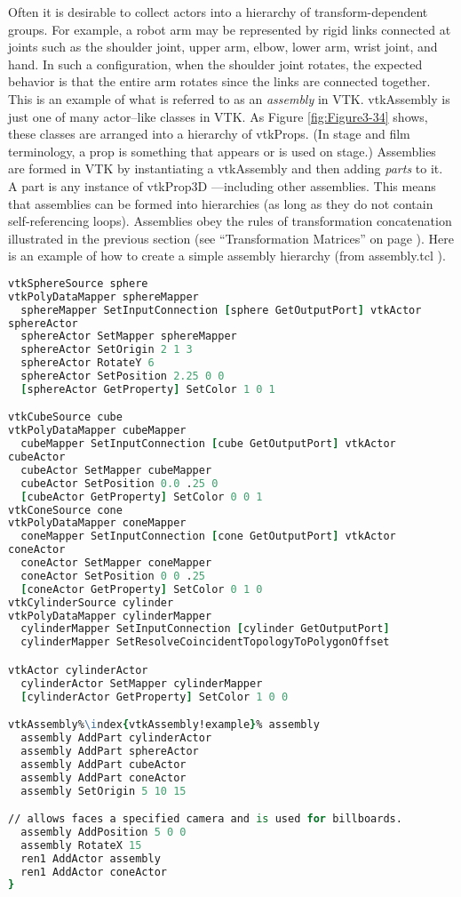 Often it is desirable to collect actors into a hierarchy of transform-dependent groups. For example, a robot arm may be represented by rigid links connected at joints such as the shoulder joint, upper arm, elbow, lower arm, wrist joint, and hand. In such a configuration, when the shoulder joint rotates, the expected behavior is that the entire arm rotates since the links are connected together. This is an example of what is referred to as an \emph{assembly} in VTK. vtkAssembly is just one of many actor--like classes in VTK. As Figure \ref{fig:Figure3-34} shows, these classes are arranged into a hierarchy of vtkProps. (In stage and film terminology, a prop is something that appears or is used on stage.) Assemblies are formed in VTK by instantiating a vtkAssembly and then adding \emph{parts} to it. A part is any instance of vtkProp3D ---including other assemblies. This means that assemblies can be formed into hierarchies (as long as they do not contain self-referencing loops). Assemblies obey the rules of transformation concatenation illustrated in the previous section (see ``Transformation Matrices'' on page \pageref{subsubsec:transform_matrices} ). Here is an example of how to create a simple assembly hierarchy (from assembly.tcl ).

\begin{lstlisting}[language=TCL, caption={Part of assembly.tcl}, escapechar=\%]
vtkSphereSource sphere
vtkPolyDataMapper sphereMapper
  sphereMapper SetInputConnection [sphere GetOutputPort] vtkActor
sphereActor
  sphereActor SetMapper sphereMapper
  sphereActor SetOrigin 2 1 3
  sphereActor RotateY 6
  sphereActor SetPosition 2.25 0 0
  [sphereActor GetProperty] SetColor 1 0 1

vtkCubeSource cube
vtkPolyDataMapper cubeMapper
  cubeMapper SetInputConnection [cube GetOutputPort] vtkActor
cubeActor
  cubeActor SetMapper cubeMapper
  cubeActor SetPosition 0.0 .25 0
  [cubeActor GetProperty] SetColor 0 0 1
vtkConeSource cone
vtkPolyDataMapper coneMapper
  coneMapper SetInputConnection [cone GetOutputPort] vtkActor
coneActor
  coneActor SetMapper coneMapper
  coneActor SetPosition 0 0 .25
  [coneActor GetProperty] SetColor 0 1 0
vtkCylinderSource cylinder
vtkPolyDataMapper cylinderMapper
  cylinderMapper SetInputConnection [cylinder GetOutputPort]
  cylinderMapper SetResolveCoincidentTopologyToPolygonOffset

vtkActor cylinderActor
  cylinderActor SetMapper cylinderMapper
  [cylinderActor GetProperty] SetColor 1 0 0

vtkAssembly%\index{vtkAssembly!example}% assembly
  assembly AddPart cylinderActor
  assembly AddPart sphereActor
  assembly AddPart cubeActor
  assembly AddPart coneActor
  assembly SetOrigin 5 10 15

// allows faces a specified camera and is used for billboards.
  assembly AddPosition 5 0 0
  assembly RotateX 15
  ren1 AddActor assembly
  ren1 AddActor coneActor
}
\end{lstlisting}

